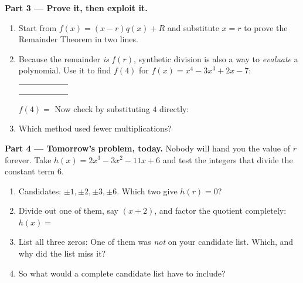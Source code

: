 \documentclass[10pt]{article}
\begin{document}
\begin{tcolorbox}[colback=white, colframe=black!40, title=\textbf{Tier E --- Extension},
    fonttitle=\bfseries, arc=1.5mm, left=3mm, right=3mm, top=2mm, bottom=2mm, breakable]
\vspace{5pt}
\textbf{Part 3 --- Prove it, then exploit it.}
\begin{enumerate}[label=(\alph*), leftmargin=1.8em, itemsep=6pt]
  \item Start from $f(x) = (x-r)q(x) + R$ and substitute $x = r$ to prove the Remainder Theorem in
        two lines. 
  \item Because the remainder \emph{is} $f(r)$, synthetic division is also a way to \emph{evaluate} a
        polynomial. Use it to find $f(4)$ for $f(x) = x^4 - 3x^3 + 2x - 7$:
    \begin{center}
    \renewcommand{\arraystretch}{1.6}
    \begin{tabular}{r|C{1.3cm}C{1.3cm}C{1.3cm}C{1.3cm}C{1.3cm}}
     &  &  &  &  &  \\
        &     &  &  &  &  \\ 
        &  &  &  &  &  \\
    \end{tabular}
    \end{center}
    $f(4) = $  \; Now check by substituting $4$ directly: 
  \item Which method used fewer multiplications? 
\end{enumerate}

\vspace{5pt}
\textbf{Part 4 --- Tomorrow's problem, today.} Nobody will hand you the value of $r$ forever. Take
$h(x) = 2x^3 - 3x^2 - 11x + 6$ and test the integers that divide the constant term $6$.
\begin{enumerate}[label=(\alph*), leftmargin=1.8em, itemsep=6pt]
  \item Candidates: $\pm 1, \pm 2, \pm 3, \pm 6$. Which two give $h(r) = 0$? 
  \item Divide out one of them, say $(x+2)$, and factor the quotient completely:
        $h(x) = $ 
  \item List all three zeros:  \; One of them was \emph{not} on your candidate list.
        Which, and why did the list miss it? 
  \item So what would a complete candidate list have to include? 
\end{enumerate}
\end{tcolorbox}
\end{document}
